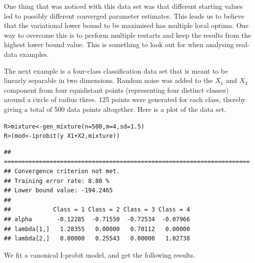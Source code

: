 \documentclass[a4paper,showframe,11pt]{report}\usepackage[]{graphicx}\usepackage[]{color}
\makeatletter
\newcommand{\hlnum}[1]{\textcolor[rgb]{0.063,0.58,0.627}{#1}}%
\newcommand{\hlopt}[1]{\textcolor[rgb]{0.196,0.196,0.196}{#1}}%
\newcommand{\hlstd}[1]{\textcolor[rgb]{0.196,0.196,0.196}{#1}}%
\newcommand{\hlkwb}[1]{\textcolor[rgb]{0.627,0,0.314}{#1}}%
\newcommand{\hlkwc}[1]{\textcolor[rgb]{0,0.631,0.314}{#1}}%
\newcommand{\hlkwd}[1]{\textcolor[rgb]{0.78,0.227,0.412}{#1}}%
\newenvironment{kframe}{%
 \def\at@end@of@kframe{}%
 \ifinner\ifhmode%
  \def\at@end@of@kframe{\end{minipage}}%
  \begin{minipage}{\columnwidth}%
 \fi\fi%
 \def\FrameCommand##1{\hskip\@totalleftmargin \hskip-\fboxsep
 \colorbox{shadecolor}{##1}\hskip-\fboxsep
     \hskip-\linewidth \hskip-\@totalleftmargin \hskip\columnwidth}%
 \MakeFramed {\advance\hsize-\width
   \@totalleftmargin\z@ \linewidth\hsize
   \@setminipage}}%
 {\par\unskip\endMakeFramed%
 \at@end@of@kframe}
\newenvironment{knitrout}{}{} %
\makeatother
\begin{document}
One thing that was noticed with this data set was that different starting values led to possibly different converged parameter estimates. This leads us to believe that the variational lower bound to be maximised has multiple local optima. One way to overcome this is to perform multiple restarts and keep the results from the highest lower bound value. This is something to look out for when analysing real-data examples.

The next example is a four-class classification data set that is meant to be linearly separable in two dimensions. Random noise was added to the $X_1$ and $X_2$ component from four equidistant points (representing four distinct classes) around a circle of radius three. 125 points were generated for each class, thereby giving a total of 500 data points altogether. Here is a plot of the data set.

\begin{knitrout}
\color{fgcolor}\begin{kframe}
\begin{alltt}
\hlstd{R> }\hlstd{mixture} \hlkwb{<-} \hlkwd{gen_mixture}\hlstd{(}\hlkwc{n} \hlstd{=} \hlnum{500}\hlstd{,} \hlkwc{m} \hlstd{=} \hlnum{4}\hlstd{,} \hlkwc{sd} \hlstd{=} \hlnum{1.5}\hlstd{)}
\hlstd{R> }\hlstd{(mod} \hlkwb{<-} \hlkwd{iprobit}\hlstd{(y} \hlopt{~} \hlstd{X1} \hlopt{+} \hlstd{X2, mixture))}
\end{alltt}
\begin{verbatim}
## ======================================================================
## Convergence criterion not met.
## Training error rate: 8.80 %
## Lower bound value: -194.2465 
## 
##            Class = 1 Class = 2 Class = 3 Class = 4
## alpha       -0.12285  -0.71550  -0.72534  -0.07966
## lambda[1,]   1.28355   0.00000   0.70112   0.00000
## lambda[2,]   0.00000   0.25543   0.00000   1.02738
\end{verbatim}
\end{kframe}
\end{knitrout}

We fit a canonical I-probit model, and get the following results.
\end{document}
